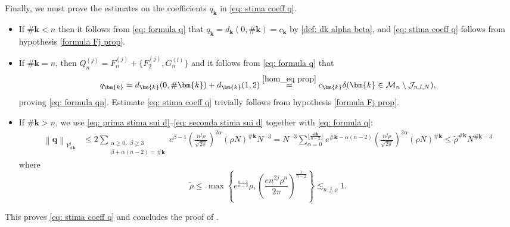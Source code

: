 \documentclass[a4paper,10pt,reqno]{article}
\theoremstyle{definition}
\theoremstyle{plain}
\theoremstyle{plain}
\theoremstyle{definition}
\theoremstyle{plain}
\theoremstyle{plain}
\theoremstyle{plain}
\theoremstyle{definition}
\theoremstyle{definition}
\newcommand{\norm}[1]{\left\lVert #1 \right\rVert}
\def \M{\mathcal{M}}
\def \k{\bm{k}}
\begin{document}
Finally, we must prove the estimates on the coefficients $q_{\k}$ in \eqref{eq: stima coeff q}.

\begin{itemize}
\item If $\# \k< n$ then it follows from \eqref{eq: formula q} that $q_{\k} = d_{\k}(0,\#\k)= c_{\k}$ by \eqref{def: dk alpha beta}, and \eqref{eq: stima coeff q} follows from hypothesis \eqref{formula Fj prop}. 
\item If $\# \k =n$, then $Q_n^{(j)} = F_n^{(j)} + \{ F_2^{(j)} , G_n^{(l)} \}$ and it follows from \eqref{eq: formula q} that
\[
q_{\k}= d_{\k} (0, \#\k) + d_{\k} (1,2) \stackrel{\eqref{hom_eq prop}}{=} c_{\k} \delta(\k \in \M_n \setminus \mathcal{J}_{n,l,N}),
\]
proving \eqref{eq: formula qn}. Estimate \eqref{eq: stima coeff q} trivially follows from hypothesis \eqref{formula Fj prop}. 

\item If $\#\k > n$, we use \eqref{eq: prima stima sui d}--\eqref{eq: seconda stima sui d} together with \eqref{eq: formula q}:
\[
\begin{split}
\norm{\bm{q}}_{Y_{\#\k}^{j}} &\le 2 \!\!\!\!\!\!\!\!\! \sum_{ \substack{ \alpha \ge 0, \, \, \beta \ge 3 \\ \beta+\alpha(n-2)=\#\k } } \!\!\!\!\!\!\!\!\! e^{\beta-1} \left ( \frac{n^j\rho}{\sqrt{2\pi}} \right )^{2\alpha} \!\!\! (\rho N)^{\#\k} N^{-3} = N^{-3} \!\!\! \sum_{\alpha=0}^{\lfloor \frac{\#\k}{n-2} \rfloor} e^{\#\k-\alpha(n-2)} \left ( \frac{n^j\rho}{\sqrt{2\pi}} \right )^{2\alpha} \!\!\! (\rho N)^{\#\k} \leq \tilde{\rho}^{\#\k} N^{\#\k -3}
\end{split}
\]
where 
\[
\tilde{\rho} \le \, \max\left\lbrace e^{\frac{n-1}{n-2}}\rho , \left( \frac{e n^{2j}\rho^n}{2\pi}\right)^{\frac{1}{n-2}} \right\rbrace \lesssim_{n,j,\rho} 1.
\]
\end{itemize}
This proves \eqref{eq: stima coeff q} and concludes the proof of . \hfill \qedsymbol
\end{document}
